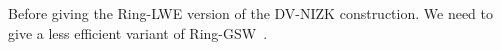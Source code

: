 %        

Before giving the Ring-LWE version of the DV-NIZK construction.
We need to give a less efficient variant of Ring-GSW~\cite{DBLP:journals/tc/KhedrGV16}.

